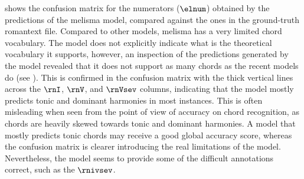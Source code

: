 

 shows the confusion matrix
for the numerators ($\elnum$) obtained by the predictions of
the \gls{melisma} model, compared against the ones in the
ground-truth \gls{romantext} file. Compared to other models,
\gls{melisma} has a very limited chord vocabulary. The model
does not explicitly indicate what is the theoretical
vocabulary it supports, however, an inspection of the
predictions generated by the model revealed that it does not
support as many chords as the recent models do (see
). This is confirmed in the
confusion matrix with the thick vertical lines across the
$\rnI$, $\rnV$, and $\rnVsev$ columns, indicating that the
model mostly predicts tonic and dominant harmonies in most
instances. This is often misleading when seen from the point
of view of accuracy on chord recognition, as chords are
heavily skewed towards tonic and dominant harmonies. A model
that mostly predicts tonic chords may receive a good global
accuracy score, whereas the confusion matrix is clearer
introducing the real limitations of the model. Nevertheless,
the model seems to provide some of the difficult annotations
correct, such as the $\rnivsev$.



